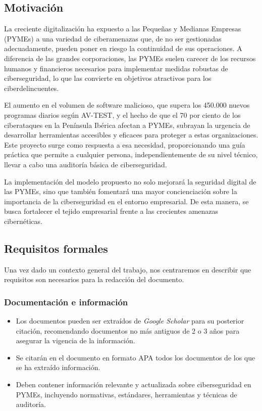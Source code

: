 \documentclass[a4paper, 10pt]{article}
\begin{document}
\subsection{Motivación}
La creciente digitalización ha expuesto a las Pequeñas y Medianas Empresas (PYMEs) a una variedad de ciberamenazas que, de no ser gestionadas adecuadamente, pueden poner en riesgo la continuidad de sus operaciones. A diferencia de las grandes corporaciones, las PYMEs suelen carecer de los recursos humanos y financieros necesarios para implementar medidas robustas de ciberseguridad, lo que las convierte en objetivos atractivos para los ciberdelincuentes.
\par\vspace{0.5cm}
El aumento en el volumen de software malicioso, que supera los 450.000 nuevos programas diarios según AV-TEST, y el hecho de que el 70 por ciento de los ciberataques en la Península Ibérica afectan a PYMEs, subrayan la urgencia de desarrollar herramientas accesibles y eficaces para proteger a estas organizaciones. Este proyecto surge como respuesta a esa necesidad, proporcionando una guía práctica que permite a cualquier persona, independientemente de su nivel técnico, llevar a cabo una auditoría básica de ciberseguridad.
\par\vspace{0.5cm}

La implementación del modelo propuesto no solo mejorará la seguridad digital de las PYMEs, sino que también fomentará una mayor concienciación sobre la importancia de la ciberseguridad en el entorno empresarial. De esta manera, se busca fortalecer el tejido empresarial frente a las crecientes amenazas cibernéticas.


\subsection{Requisitos formales}
Una vez dado un contexto general del trabajo, nos centraremos en describir que requisitos son necesarios para la redacción
 del documento.
\subsubsection{Documentación e información}
\begin{itemize}
    \item Los documentos pueden ser extraídos de \textit{Google Scholar} para su posterior citación, recomendando documentos no más antiguos de 2 o 3 años para asegurar la vigencia de la información.
    \item Se citarán en el documento en formato APA todos los documentos de los que se ha extraído información.
    \item Deben contener información relevante y actualizada sobre ciberseguridad en PYMEs, incluyendo normativas, estándares, herramientas y técnicas de auditoría.
\end{itemize}
\end{document}
